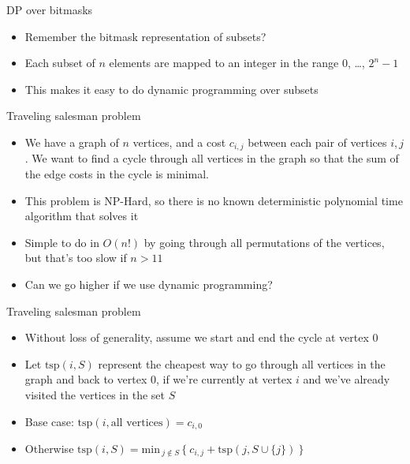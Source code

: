 \documentclass[12pt,t]{beamer}
\newcommand{\bi}{\begin{itemize}}
\newcommand{\ei}{\end{itemize}}
\begin{document}
\begin{frame}{DP over bitmasks}
    \vspace{40pt}
    \bi
        \item Remember the bitmask representation of subsets?
        \item Each subset of $n$ elements are mapped to an integer in the range $0$, \ldots, $2^{n} - 1$
        \item This makes it easy to do dynamic programming over subsets
    \ei
\end{frame}

\begin{frame}{Traveling salesman problem}
    \vspace{10pt}

    \bi
        \item We have a graph of $n$ vertices, and a cost $c_{i,j}$ between each pair of vertices $i, j$. We want to find a cycle through all vertices in the graph so that the sum of the edge costs in the cycle is minimal.

        \vspace{5pt}
        \item This problem is NP-Hard, so there is no known deterministic polynomial time algorithm that solves it

        \vspace{10pt}
        \item Simple to do in $O(n!)$ by going through all permutations of the vertices, but that's too slow if $n > 11$

        \vspace{10pt}
        \item Can we go higher if we use dynamic programming?
    \ei
\end{frame}

\begin{frame}{Traveling salesman problem}
    \vspace{20pt}
    \bi
\item Without loss of generality, assume we start and end the cycle at vertex $0$
    \vspace{10pt}

\item Let $\mathrm{tsp}(i, S)$ represent the cheapest way to go through all vertices in the graph and back to vertex $0$, if we're currently at vertex $i$ and we've already visited the vertices in the set $S$

    \vspace{20pt}
\item Base case: $\mathrm{tsp}(i, \textrm{all vertices}) = c_{i,0}$
\item Otherwise $\mathrm{tsp}(i, S) = \mathrm{min}_{\ j \not\in S\ } \{\ c_{i,j} + \mathrm{tsp}(j, S \cup \{j\})\ \}$
    \ei
\end{frame}
\end{document}
